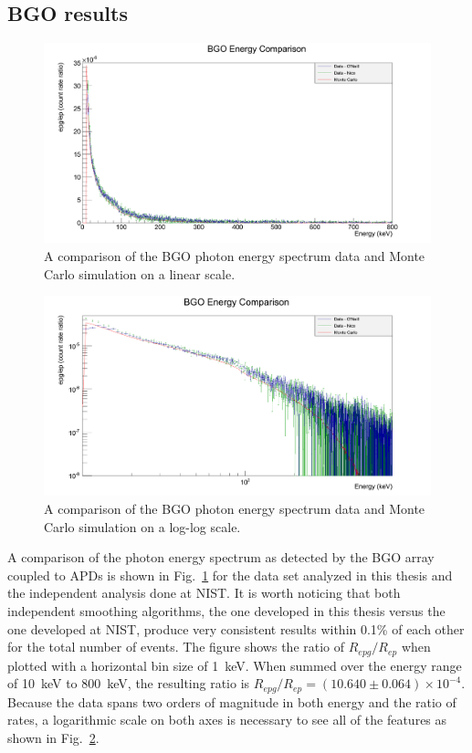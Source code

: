 \documentclass[oneside,12pt]{memoir}
\begin{document}
\subsection{BGO results}
\label{sec:bgo_results}
\begin{figure}[t]
	\includegraphics[width=\textwidth]
		{bgo_comparison.png}
	\caption[Comparison of BGO data and Monte Carlo on a linear scale.]{A comparison of the BGO photon energy spectrum data and Monte Carlo simulation on a linear scale.}
	\label{fig:bgo_mc_comp}
\end{figure}
\begin{figure}[t]
	\includegraphics[width=\textwidth]
		{bgo_comparison_log_log.png}
	\caption[Comparison of BGO data and Monte Carlo on a log-log scale.]{A comparison of the BGO photon energy spectrum data and Monte Carlo simulation on a log-log scale.}
	\label{fig:bgo_mc_comp_log}
\end{figure}
A comparison of the photon energy spectrum as detected by the BGO array coupled to APDs is shown in Fig.~\ref{fig:bgo_mc_comp} for the data set analyzed in this thesis and the independent analysis done at NIST. It is worth noticing that both independent smoothing algorithms, the one developed in this thesis versus the one developed at NIST,  produce very consistent results within 0.1\% of each other for the total number of events. The figure shows the ratio of $R_{epg}/R_{ep}$ when plotted with a horizontal bin size of 1~keV. When summed over the energy range of 10~keV to 800~keV, the resulting ratio is $R_{epg}/R_{ep}=(10.640 \pm 0.064)\times 10^{-4}$. Because the data spans two orders of magnitude in both energy and the ratio of rates, a logarithmic scale on both axes is necessary to see all of the features as shown in Fig.~\ref{fig:bgo_mc_comp_log}.\par
\end{document}
